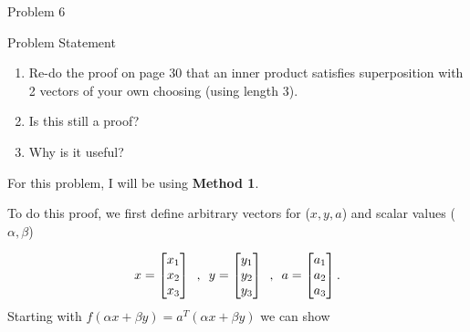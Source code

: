 \begin{problem}{Problem 6}
    \begin{statement}{Problem Statement}
        \begin{enumerate}[label=(\alph*)]
            \item Re-do the proof on page 30 that an inner product satisfies superposition with 2 vectors of your own choosing (using length 3).
            \item Is this still a proof?
            \item Why is it useful?
        \end{enumerate}
    \end{statement}

    \begin{Highlight}
        For this problem, I will be using \textbf{Method 1}. \vspace*{1em}

        To do this proof, we first define arbitrary vectors for ($x,y,a$) and scalar values ($\alpha,\beta$)

        \setcounter{equation}{0}
        \begin{equation}
            x =
            \begin{bmatrix}
                x_{1} \\
                x_{2} \\
                x_{3} \\
            \end{bmatrix}
            \hspace*{5pt} , \hspace*{5pt}
            y = 
            \begin{bmatrix}
                y_{1} \\
                y_{2} \\
                y_{3} \\
            \end{bmatrix}
            \hspace*{5pt} , \hspace*{5pt}
            a = 
            \begin{bmatrix}
                a_{1} \\
                a_{2} \\
                a_{3} \\
            \end{bmatrix}.
        \end{equation}
        Starting with $f(\alpha x + \beta y) = a^{T}(\alpha x + \beta y)$ we can show
        

\end{Highlight}
\end{problem}

